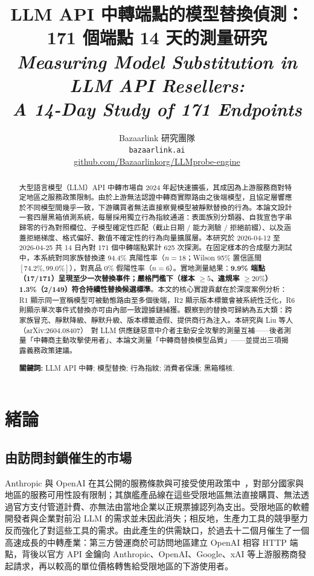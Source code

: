 \documentclass[UTF8,fontset=none,10pt,a4paper,twocolumn]{ctexart}
\title{LLM API 中轉端點的模型替換偵測：\\
  171 個端點 14 天的測量研究 \\[6pt]
  \large \textit{Measuring Model Substitution in LLM API Resellers:\\
    A 14-Day Study of 171 Endpoints}}
\author{Bazaarlink 研究團隊\\
  \texttt{bazaarlink.ai}\\
  \href{https://github.com/Bazaarlinkorg/LLMprobe-engine}{github.com/Bazaarlinkorg/LLMprobe-engine}}
\date{}
\begin{document}
\maketitle

\begin{abstract}
大型語言模型（LLM）API 中轉市場自 2024 年起快速擴張，其成因為上游服務商對特定地區之服務政策限制。由於上游無法認證中轉商實際路由之後端模型，且協定層響應於不同模型間幾乎一致，下游購買者無法直接察覺模型被靜默替換的行為。本論文設計一套四層黑箱偵測系統，每層採用獨立行為指紋通道：表面族別分類器、自我宣告字串歸零的行為對照欄位、子模型確定性匹配（截止日期 / 能力測驗 / 拒絕前綴）、以及涵蓋拒絕梯度、格式偏好、數值不確定性的行為向量擴展層。本研究於 2026-04-12 至 2026-04-25 共 14 日內對 171 個中轉端點累計 625 次探測。在固定樣本的合成壓力測試中，本系統對同家族替換達 94.4\% 真陽性率（$n{=}18$；Wilson 95\% 置信區間 $[74.2\%, 99.0\%]$），對真品 0\% 假陽性率（$n{=}6$）。實地測量結果：\textbf{9.9\% 端點（17/171）呈現至少一次替換事件；嚴格門檻下（樣本 ${\geq}5$、違規率 ${\geq}20\%$）1.3\%（2/149）符合持續性替換候選標準}。本文的核心實證貢獻在於深度案例分析：R1 顯示同一宣稱模型可被動態路由至多個後端，R2 顯示版本標籤會被系統性泛化，R6 則顯示單次事件式替換亦可由內部一致證據鏈捕獲。觀察到的替換可歸納為五大類：跨家族冒充、靜默降級、靜默升級、版本標籤造假、提供商行為注入。本研究與 Liu 等人（arXiv:2604.08407）~\cite{liu2026agent}對 LLM 供應鏈惡意中介者主動安全攻擊的測量互補——後者測量「中轉商主動攻擊使用者」、本論文測量「中轉商替換模型品質」——並提出三項揭露義務政策建議。

\medskip
\noindent\textbf{關鍵詞:} LLM API 中轉; 模型替換; 行為指紋; 消費者保護; 黑箱稽核.
\end{abstract}

\section{緒論}\label{sec:intro}

\subsection{由訪問封鎖催生的市場}
Anthropic 與 OpenAI 在其公開的服務條款與可接受使用政策中~\cite{anthropic2026aup,openai2026usage}，對部分國家與地區的服務可用性設有限制；其旗艦產品線在這些受限地區無法直接購買、無法透過官方支付管道計費、亦無法由當地企業以正規票據認列為支出。受限地區的軟體開發者與企業對前沿 LLM 的需求並未因此消失；相反地，生產力工具的競爭壓力反而強化了對這些工具的需求。由此產生的供需缺口，於過去十二個月催生了一個高速成長的中轉產業：第三方營運商於可訪問地區建立 OpenAI 相容 HTTP 端點，背後以官方 API 金鑰向 Anthropic、OpenAI、Google、xAI 等上游服務商發起請求，再以較高的單位價格轉售給受限地區的下游使用者。
\end{document}
